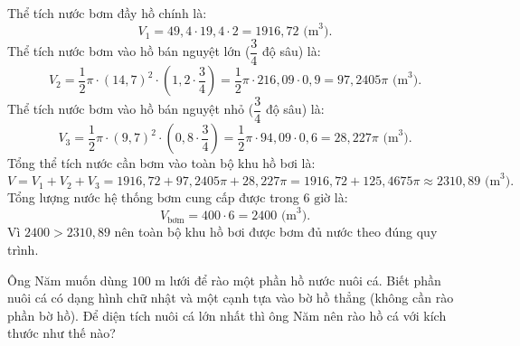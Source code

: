 \begin{bt}
{\begin{enumerate}[a)]
	Thể tích nước bơm đầy hồ chính là:
	$$V_1 = 49{,}4 \cdot 19{,}4 \cdot 2 = 1916{,}72\text{ (m}^3\text{)}.$$
	Thể tích nước bơm vào hồ bán nguyệt lớn ($\dfrac{3}{4}$ độ sâu) là:
	$$V_2 = \dfrac{1}{2}\pi \cdot (14{,}7)^2 \cdot \left(1{,}2 \cdot \dfrac{3}{4}\right) = \dfrac{1}{2}\pi \cdot 216{,}09 \cdot 0{,}9 = 97{,}2405\pi\text{ (m}^3\text{)}.$$
	Thể tích nước bơm vào hồ bán nguyệt nhỏ ($\dfrac{3}{4}$ độ sâu) là:
	$$V_3 = \dfrac{1}{2}\pi \cdot (9{,}7)^2 \cdot \left(0{,}8 \cdot \dfrac{3}{4}\right) = \dfrac{1}{2}\pi \cdot 94{,}09 \cdot 0{,}6 = 28{,}227\pi\text{ (m}^3\text{)}.$$
	Tổng thể tích nước cần bơm vào toàn bộ khu hồ bơi là:
	$$V = V_1 + V_2 + V_3 = 1916{,}72 + 97{,}2405\pi + 28{,}227\pi = 1916{,}72 + 125{,}4675\pi \approx 2310{,}89\text{ (m}^3\text{)}.$$
	Tổng lượng nước hệ thống bơm cung cấp được trong $6\text{ giờ}$ là:
	$$V_{\text{bơm}} = 400 \cdot 6 = 2400\text{ (m}^3\text{)}.$$
	Vì $2400 > 2310{,}89$ nên toàn bộ khu hồ bơi được bơm đủ nước theo đúng quy trình.
\end{enumerate}
}
\end{bt}

\begin{bt}%
Ông Năm muốn dùng $100\text{ m}$ lưới để rào một phần hồ nước nuôi cá. Biết phần nuôi cá có dạng hình chữ nhật và một cạnh tựa vào bờ hồ thẳng (không cần rào phần bờ hồ). Để diện tích nuôi cá lớn nhất thì ông Năm nên rào hồ cá với kích thước như thế nào?
\end{bt}

